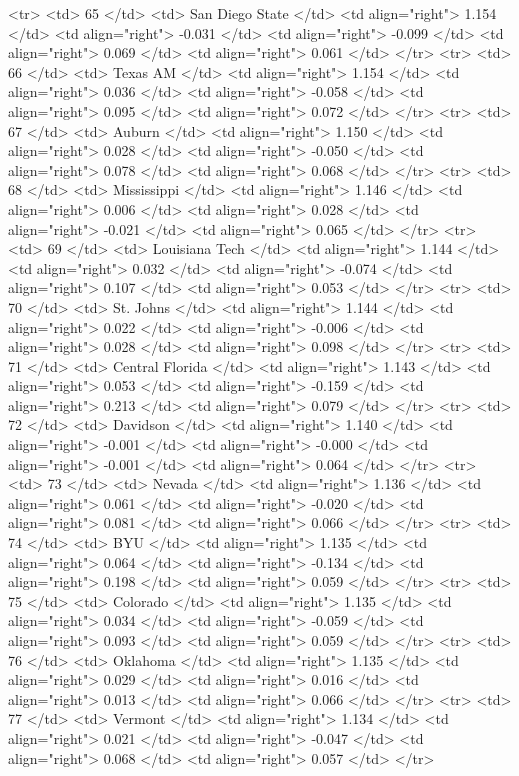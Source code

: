   <tr> <td> 65 </td> <td> San Diego State </td> <td align="right"> 1.154 </td> <td align="right"> -0.031 </td> <td align="right"> -0.099 </td> <td align="right"> 0.069 </td> <td align="right"> 0.061 </td> </tr>
  <tr> <td> 66 </td> <td> Texas AM </td> <td align="right"> 1.154 </td> <td align="right"> 0.036 </td> <td align="right"> -0.058 </td> <td align="right"> 0.095 </td> <td align="right"> 0.072 </td> </tr>
  <tr> <td> 67 </td> <td> Auburn </td> <td align="right"> 1.150 </td> <td align="right"> 0.028 </td> <td align="right"> -0.050 </td> <td align="right"> 0.078 </td> <td align="right"> 0.068 </td> </tr>
  <tr> <td> 68 </td> <td> Mississippi </td> <td align="right"> 1.146 </td> <td align="right"> 0.006 </td> <td align="right"> 0.028 </td> <td align="right"> -0.021 </td> <td align="right"> 0.065 </td> </tr>
  <tr> <td> 69 </td> <td> Louisiana Tech </td> <td align="right"> 1.144 </td> <td align="right"> 0.032 </td> <td align="right"> -0.074 </td> <td align="right"> 0.107 </td> <td align="right"> 0.053 </td> </tr>
  <tr> <td> 70 </td> <td> St. Johns </td> <td align="right"> 1.144 </td> <td align="right"> 0.022 </td> <td align="right"> -0.006 </td> <td align="right"> 0.028 </td> <td align="right"> 0.098 </td> </tr>
  <tr> <td> 71 </td> <td> Central Florida </td> <td align="right"> 1.143 </td> <td align="right"> 0.053 </td> <td align="right"> -0.159 </td> <td align="right"> 0.213 </td> <td align="right"> 0.079 </td> </tr>
  <tr> <td> 72 </td> <td> Davidson </td> <td align="right"> 1.140 </td> <td align="right"> -0.001 </td> <td align="right"> -0.000 </td> <td align="right"> -0.001 </td> <td align="right"> 0.064 </td> </tr>
  <tr> <td> 73 </td> <td> Nevada </td> <td align="right"> 1.136 </td> <td align="right"> 0.061 </td> <td align="right"> -0.020 </td> <td align="right"> 0.081 </td> <td align="right"> 0.066 </td> </tr>
  <tr> <td> 74 </td> <td> BYU </td> <td align="right"> 1.135 </td> <td align="right"> 0.064 </td> <td align="right"> -0.134 </td> <td align="right"> 0.198 </td> <td align="right"> 0.059 </td> </tr>
  <tr> <td> 75 </td> <td> Colorado </td> <td align="right"> 1.135 </td> <td align="right"> 0.034 </td> <td align="right"> -0.059 </td> <td align="right"> 0.093 </td> <td align="right"> 0.059 </td> </tr>
  <tr> <td> 76 </td> <td> Oklahoma </td> <td align="right"> 1.135 </td> <td align="right"> 0.029 </td> <td align="right"> 0.016 </td> <td align="right"> 0.013 </td> <td align="right"> 0.066 </td> </tr>
  <tr> <td> 77 </td> <td> Vermont </td> <td align="right"> 1.134 </td> <td align="right"> 0.021 </td> <td align="right"> -0.047 </td> <td align="right"> 0.068 </td> <td align="right"> 0.057 </td> </tr>
